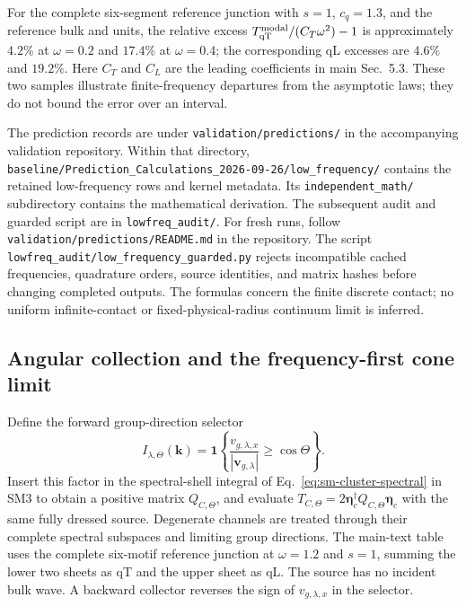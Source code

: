 \documentclass[10pt,aps,onecolumn,notitlepage,nofootinbib]{revtex4-2}
\newcommand{\vk}{\bm k}
\newcommand{\veta}{\bm\eta}
\newcommand{\qT}{\mathrm{qT}}
\begin{document}
For the complete six-segment reference junction with $s=1$, $c_q=1.3$, and the reference bulk and units, the relative excess $T_{\qT}^{\rm modal}/(C_T\omega^2)-1$ is approximately $4.2\%$ at $\omega=0.2$ and $17.4\%$ at $\omega=0.4$; the corresponding qL excesses are $4.6\%$ and $19.2\%$. Here $C_T$ and $C_L$ are the leading coefficients in main Sec.~5.3. These two samples illustrate finite-frequency departures from the asymptotic laws; they do not bound the error over an interval.

The prediction records are under \nolinkurl{validation/predictions/} in the accompanying validation repository. Within that directory, \nolinkurl{baseline/Prediction_Calculations_2026-09-26/low_frequency/} contains the retained low-frequency rows and kernel metadata. Its \nolinkurl{independent_math/} subdirectory contains the mathematical derivation. The subsequent audit and guarded script are in \nolinkurl{lowfreq_audit/}. For fresh runs, follow \nolinkurl{validation/predictions/README.md} in the repository. The script \nolinkurl{lowfreq_audit/low_frequency_guarded.py} rejects incompatible cached frequencies, quadrature orders, source identities, and matrix hashes before changing completed outputs. The formulas concern the finite discrete contact; no uniform infinite-contact or fixed-physical-radius continuum limit is inferred.

\subsection{Angular collection and the frequency-first cone limit}
\label{pred:sm-sec-collection}

Define the forward group-direction selector
\begin{equation}
 I_{\lambda,\Theta}(\vk)
 =\mathbf1\!\left\{\frac{v_{g,\lambda,x}}{|\bm v_{g,\lambda}|}\geq\cos\Theta\right\}.
\end{equation}
Insert this factor in the spectral-shell integral of Eq.~\eqref{eq:sm-cluster-spectral} in SM3 to obtain a positive matrix $Q_{C,\Theta}$, and evaluate $T_{C,\Theta}=2\veta_c^\dagger Q_{C,\Theta}\veta_c$ with the same fully dressed source. Degenerate channels are treated through their complete spectral subspaces and limiting group directions. The main-text table uses the complete six-motif reference junction at $\omega=1.2$ and $s=1$, summing the lower two sheets as qT and the upper sheet as qL. The source has no incident bulk wave. A backward collector reverses the sign of $v_{g,\lambda,x}$ in the selector.
\end{document}
